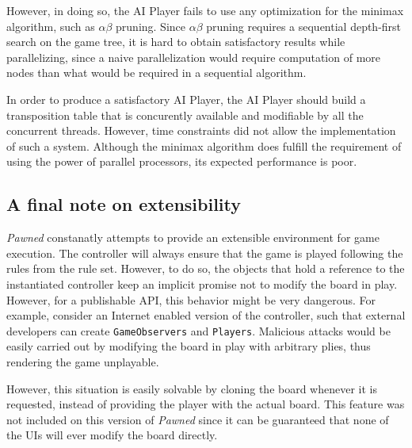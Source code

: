 	However, in doing so, the AI Player fails to use any optimization for the minimax algorithm, such as 
	$\alpha \beta$ pruning. Since $\alpha \beta$ pruning requires a sequential depth-first search on the 
	game tree, it is hard to obtain satisfactory results while parallelizing, since a naive parallelization 
	would require computation of more nodes than what would be required in a sequential algorithm. 
	
	In order to produce a satisfactory AI Player, the AI Player should build a transposition table that is
	concurently available and modifiable by all the concurrent threads. However, time constraints did not 
	allow the implementation of such a system. Although the minimax algorithm does fulfill the requirement
	of using the power of parallel processors, its expected performance is poor. 


\subsection{A final note on extensibility}\label{final-extensibility}

\emph{Pawned} constanatly attempts to provide an extensible environment for game execution. The controller
will always  ensure that the game is played following the rules from the rule set. 
However, to do so, the objects that hold a reference
to the instantiated controller keep an implicit promise not to modify the board in play. However, for a 
publishable API, this behavior might be very dangerous. For example, consider an Internet enabled version of the controller, 
such that external developers can create \texttt{GameObservers} and \texttt{Players}. Malicious attacks would be easily 
carried out by modifying the board in play with arbitrary plies, thus rendering the game unplayable. 

However, this situation is easily solvable by cloning the board whenever it is requested, instead
of providing the player with the actual board. This feature was not included on this version of \emph{Pawned} since
it can be guaranteed that none of the UIs will ever modify the board directly. 